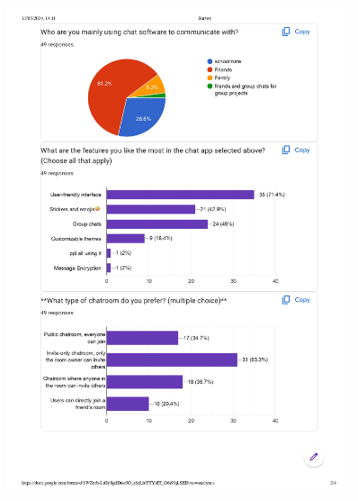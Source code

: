 \documentclass[12pt]{article}
\begin{document}
        \begin{figure}[H]
            \centering
            \includegraphics[width=0.9\textwidth]{graphs/Survey-summary_page-0002.jpg}
        \end{figure}
\end{document}
